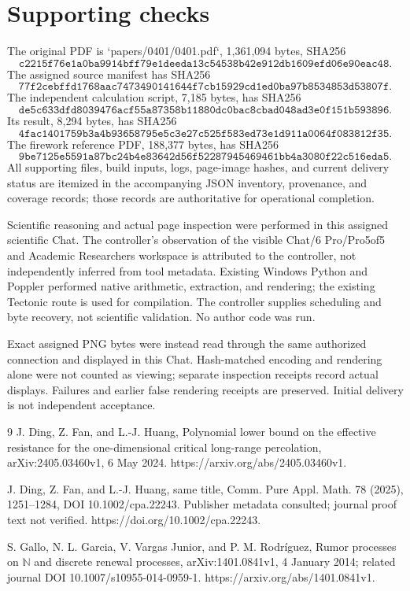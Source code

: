\documentclass[10pt]{article}
\begin{document}
\section*{Supporting checks}
The original PDF is `papers/0401/0401.pdf`, 1,361,094 bytes, SHA256 \[\texttt{c2215f76e1a0ba9914bff79e1deeda13c54538b42e912db1609efd06e90eac48}.\] The assigned source manifest has SHA256 \[\texttt{77f2cebffd1768aac7473490141644f7cb15929cd1ed0ba97b8534853d53807f}.\] The independent calculation script, 7,185 bytes, has SHA256 \[\texttt{de5c633dfd8039476acf55a87358b11880dc0bac8cbad048ad3e0f151b593896}.\] Its result, 8,294 bytes, has SHA256 \[\texttt{4fac1401759b3a4b93658795e5c3e27c525f583ed73e1d911a0064f083812f35}.\] The firework reference PDF, 188,377 bytes, has SHA256 \[\texttt{9be7125e5591a87bc24b4e83642d56f52287945469461bb4a3080f22c516eda5}.\] All supporting files, build inputs, logs, page-image hashes, and current delivery status are itemized in the accompanying JSON inventory, provenance, and coverage records; those records are authoritative for operational completion.\par
Scientific reasoning and actual page inspection were performed in this assigned scientific Chat. The controller’s observation of the visible Chat/6 Pro/Pro5of5 and Academic Researchers workspace is attributed to the controller, not independently inferred from tool metadata. Existing Windows Python and Poppler performed native arithmetic, extraction, and rendering; the existing Tectonic route is used for compilation. The controller supplies scheduling and byte recovery, not scientific validation. No author code was run.\par
Exact assigned PNG bytes were instead read through the same authorized connection and displayed in this Chat. Hash-matched encoding and rendering alone were not counted as viewing; separate inspection receipts record actual displays. Failures and earlier false rendering receipts are preserved. Initial delivery is not independent acceptance.\par
9 J. Ding, Z. Fan, and L.-J. Huang, Polynomial lower bound on the effective resistance for the one-dimensional critical long-range percolation, arXiv:2405.03460v1, 6 May 2024. https://arxiv.org/abs/2405.03460v1.\par
J. Ding, Z. Fan, and L.-J. Huang, same title, Comm. Pure Appl. Math. 78 (2025), 1251–1284, DOI 10.1002/cpa.22243. Publisher metadata consulted; journal proof text not verified. https://doi.org/10.1002/cpa.22243.\par
S. Gallo, N. L. Garcia, V. Vargas Junior, and P. M. Rodríguez, Rumor processes on \(\mathbb N\) and discrete renewal processes, arXiv:1401.0841v1, 4 January 2014; related journal DOI 10.1007/s10955-014-0959-1. https://arxiv.org/abs/1401.0841v1.\par
\end{document}

